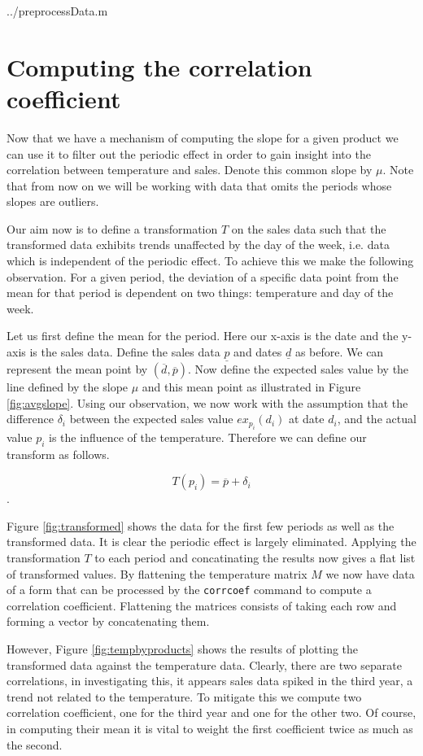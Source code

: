  {../preprocessData.m}

\section{Computing the correlation coefficient}

Now that we have a mechanism of computing the slope for a given product we can use it to filter out the periodic effect in order to gain insight into the correlation between temperature and sales. Denote this common slope by $\mu$. Note that from now on we will be working with data that omits the periods whose slopes are outliers. 

Our aim now is to define a transformation $T$ on the sales data such that the transformed data exhibits trends unaffected by the day of the week, i.e. data which is independent of the periodic effect. To achieve this we make the following observation. For a given period, the deviation of a specific data point from the mean for that period is dependent on two things: temperature and day of the week. 

Let us first define the mean for the period. Here our x-axis is the date and the y-axis is the sales data. Define the sales data $\underline{p}$ and dates $\underline{d}$ as before. We can represent the mean point by $(\overline{d}, \overline{p})$. Now define the expected sales value by the line defined by the slope $\mu$ and this mean point as illustrated in Figure \ref{fig:avgslope}. Using our observation, we now work with the assumption that the difference $\delta_i$ between the expected sales value $ex_{p_i}(d_i)$ at date $d_i$, and the actual value $p_i$ is the influence of the temperature. Therefore we can define our transform as follows.

$$ T(p_i) = \overline{p} + \delta_i $$.

Figure \ref{fig:transformed} shows the data for the first few periods as well as the transformed data. It is clear the periodic effect is largely eliminated. Applying the transformation $T$ to each period and concatinating the results now gives a flat list of transformed values. By flattening the temperature matrix $M$ we now have data of a form that can be processed by the \texttt{corrcoef} command to compute a correlation coefficient. Flattening the matrices consists of taking each row and forming a vector by concatenating them.

However, Figure \ref{fig:tempbyproducts} shows the results of plotting the transformed data against the temperature data. Clearly, there are two separate correlations, in investigating this, it appears sales data spiked in the third year, a trend not related to the temperature. To mitigate this we compute two correlation coefficient, one for the third year and one for the other two. Of course, in computing their mean it is vital to weight the first coefficient twice as much as the second.

